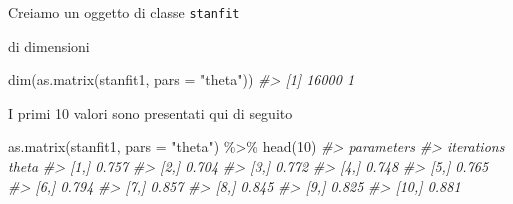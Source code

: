\documentclass[
  10pt,
  italian,
  a4paper,
  extrafontsizes,onecolumn,openright
  ]{memoir}
\newenvironment{Shaded}{}{}
\newcommand{\AttributeTok}[1]{\textcolor[rgb]{0.49,0.56,0.16}{#1}}
\newcommand{\CommentTok}[1]{\textcolor[rgb]{0.38,0.63,0.69}{\textit{#1}}}
\newcommand{\DecValTok}[1]{\textcolor[rgb]{0.25,0.63,0.44}{#1}}
\newcommand{\FunctionTok}[1]{\textcolor[rgb]{0.02,0.16,0.49}{#1}}
\newcommand{\NormalTok}[1]{#1}
\newcommand{\OtherTok}[1]{\textcolor[rgb]{0.00,0.44,0.13}{#1}}
\newcommand{\SpecialCharTok}[1]{\textcolor[rgb]{0.25,0.44,0.63}{#1}}
\newcommand{\StringTok}[1]{\textcolor[rgb]{0.25,0.44,0.63}{#1}}
\begin{document}
\begin{Shaded}
\end{Shaded}

\noindent
Creiamo un oggetto di classe \texttt{stanfit}

\begin{Shaded}
\end{Shaded}

\noindent
di dimensioni

\begin{Shaded}
\begin{Highlighting}[]
\FunctionTok{dim}\NormalTok{(}\FunctionTok{as.matrix}\NormalTok{(stanfit1, }\AttributeTok{pars =} \StringTok{"theta"}\NormalTok{))}
\CommentTok{\#\textgreater{} [1] 16000     1}
\end{Highlighting}
\end{Shaded}

\noindent
I primi 10 valori sono presentati qui di seguito

\begin{Shaded}
\begin{Highlighting}[]
\FunctionTok{as.matrix}\NormalTok{(stanfit1, }\AttributeTok{pars =} \StringTok{"theta"}\NormalTok{) }\SpecialCharTok{\%\textgreater{}\%} 
  \FunctionTok{head}\NormalTok{(}\DecValTok{10}\NormalTok{)}
\CommentTok{\#\textgreater{}           parameters}
\CommentTok{\#\textgreater{} iterations theta}
\CommentTok{\#\textgreater{}       [1,] 0.757}
\CommentTok{\#\textgreater{}       [2,] 0.704}
\CommentTok{\#\textgreater{}       [3,] 0.772}
\CommentTok{\#\textgreater{}       [4,] 0.748}
\CommentTok{\#\textgreater{}       [5,] 0.765}
\CommentTok{\#\textgreater{}       [6,] 0.794}
\CommentTok{\#\textgreater{}       [7,] 0.857}
\CommentTok{\#\textgreater{}       [8,] 0.845}
\CommentTok{\#\textgreater{}       [9,] 0.825}
\CommentTok{\#\textgreater{}      [10,] 0.881}
\end{Highlighting}
\end{Shaded}
\end{document}
